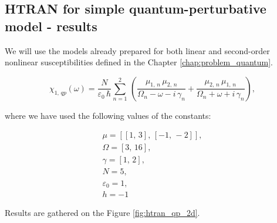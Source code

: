 \documentclass[12pt,twoside,a4paper]{article}
\numberwithin{equation}{subsection}
\numberwithin{figure}{subsection}
\begin{document}
\subsection{HTRAN for simple quantum-perturbative model - results} \label{chap:htran_quantum}

We will use the models already prepared for both linear and second-order nonlinear susceptibilities defined in the Chapter
\ref{chap:problem_quantum}.

\begin{equation} \label{eq:htran_qpeq}
  \chi_{1, \,qp}(\omega ) = 
  \frac{N}{\varepsilon_0\,\hbar} \sum_{n=1}^{2}\,(\frac {{\mu_{1, \,n}}\,{\mu_{2, \,n}}}{{\Omega_{n}} - \omega -
  i\,{\gamma_{n}}} + \frac {{\mu_{2, \,n}}\,{\mu_{1, \,n}}}{{\Omega_{n}} + \omega + i\,{\gamma_{n}}}) ,
\end{equation}

where we have used the following values of the constants: 

\begin{multline*}
  \mu = [[1, \,3], \,[ -1, \, -2]],\\
  \Omega =[3, \,16], \\
  \gamma =[1, \,2],\\
  N=5, \\
  \varepsilon_{0}=1, \\
  h= - 1
\end{multline*}

Results are gathered on the Figure \ref{fig:htran_qp_2d}.
\end{document}
